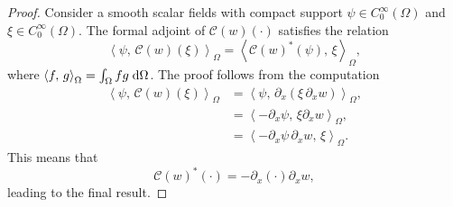 \documentclass{ifacconf}
\newcommand{\inner}[3][]{\ensuremath{\left\langle #2, \, #3 \right\rangle_{#1}}}
\newtheorem{proof}{Proof}
\begin{document}
\begin{proof}
	Consider a smooth scalar fields with compact support  $\psi \in C^\infty_0(\Omega)$ and $\xi \in C^\infty_0(\Omega)$. The formal adjoint of $\mathcal{C}(w)(\cdot)$ satisfies the relation
	\begin{equation}
		\inner[\Omega]{\psi}{\mathcal{C}(w)(\xi)} = \inner[\Omega]{\mathcal{C}(w)^*(\psi)}{\xi},
	\end{equation}
	where $\inner[\Omega]{f}{g} = \int_\Omega f g \d{\Omega}$.
	The proof follows from the computation
	\begin{equation}
		\begin{aligned}
			\inner[\Omega]{\psi}{\mathcal{C}(w)(\xi)} &= \inner[\Omega]{\psi}{\partial_x(\xi \, \partial_x w)}, \\
			&= \inner[\Omega]{-\partial_x \psi}{\xi \partial_x w}, \\
			&= \inner[\Omega]{-\partial_x \psi \, \partial_x w}{\xi}.
		\end{aligned} 
	\end{equation}
	This means that
	\begin{equation}
		\mathcal{C}(w)^*(\cdot) = -\partial_x (\cdot) \partial_x w,
	\end{equation}
	leading to the final result.
\end{proof}
\end{document}
